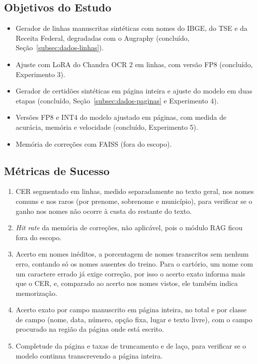 \documentclass[12pt,a4paper]{article}
\begin{document}
\subsection{Objetivos do Estudo}

\begin{itemize}
    \item Gerador de linhas manuscritas sintéticas com nomes do IBGE, do TSE e da Receita Federal, degradadas com o Augraphy (concluído, Seção~\ref{subsec:dados-linhas}).
    \item Ajuste com LoRA do Chandra OCR 2 em linhas, com versão FP8 (concluído, Experimento 3).
    \item Gerador de certidões sintéticas em página inteira e ajuste do modelo em duas etapas (concluído, Seção~\ref{subsec:dados-paginas} e Experimento 4).
    \item Versões FP8 e INT4 do modelo ajustado em páginas, com medida de acurácia, memória e velocidade (concluído, Experimento 5).
    \item Memória de correções com FAISS (fora do escopo).
\end{itemize}

\subsection{Métricas de Sucesso}

\begin{enumerate}
    \item CER segmentado em linhas, medido separadamente no texto geral, nos nomes comuns e nos raros (por prenome, sobrenome e município), para verificar se o ganho nos nomes não ocorre à custa do restante do texto.
    \item \emph{Hit rate} da memória de correções, não aplicável, pois o módulo RAG ficou fora do escopo.
    \item Acerto em nomes inéditos, a porcentagem de nomes transcritos sem nenhum erro, contando só os nomes ausentes do treino. Para o cartório, um nome com um caractere errado já exige correção, por isso o acerto exato informa mais que o CER, e, comparado ao acerto nos nomes vistos, ele também indica memorização.
    \item Acerto exato por campo manuscrito em página inteira, no total e por classe de campo (nome, data, número, opção fixa, lugar e texto livre), com o campo procurado na região da página onde está escrito.
    \item Completude da página e taxas de truncamento e de laço, para verificar se o modelo continua transcrevendo a página inteira.
\end{enumerate}
\end{document}
